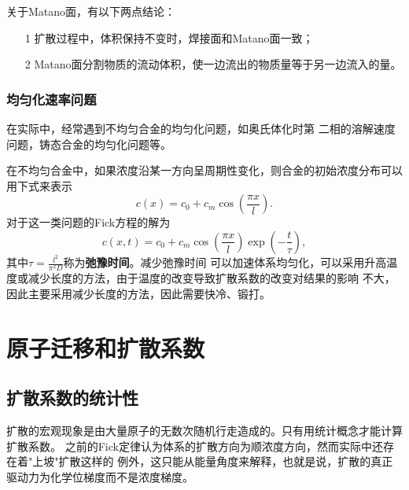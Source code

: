                 关于Matano面，有以下两点结论：
                \begin{itemize}
                    \item[1] 扩散过程中，体积保持不变时，焊接面和Matano面一致；
                    \item[2] Matano面分割物质的流动体积，使一边流出的物质量等于另一边流入的量。
                \end{itemize}
            \subsubsection{均匀化速率问题}
                在实际中，经常遇到不均匀合金的均匀化问题，如奥氏体化时第
                二相的溶解速度问题，铸态合金的均匀化问题等。

                在不均匀合金中，如果浓度沿某一方向呈周期性变化，则合金的初始浓度分布可以用下式来表示
                \begin{equation}
                    c(x)=c_0+c_m\cos\left( \frac{\pi x}{l} \right).
                \end{equation}
                对于这一类问题的Fick方程的解为
                \begin{equation}
                    c(x, t)=c_{0}+c_{m} \cos \left(\frac{\pi x}{l}\right) \exp \left(-\frac{t}{\tau}\right),
                \end{equation}
                其中$\tau=\frac{l^2}{\pi^2D}$称为\textbf{弛豫时间}。减少弛豫时间
                可以加速体系均匀化，可以采用升高温度或减少长度的方法，由于温度的改变导致扩散系数的改变对结果的影响
                不大，因此主要采用减少长度的方法，因此需要快冷、锻打。
    
    \section{原子迁移和扩散系数}
        \subsection{扩散系数的统计性}   
            扩散的宏观现象是由大量原子的无数次随机行走造成的。只有用统计概念才能计算扩散系数。
            之前的Fick定律认为体系的扩散方向为顺浓度方向，然而实际中还存在着"上坡"扩散这样的
            例外，这只能从能量角度来解释，也就是说，扩散的真正驱动力为化学位梯度而不是浓度梯度。

